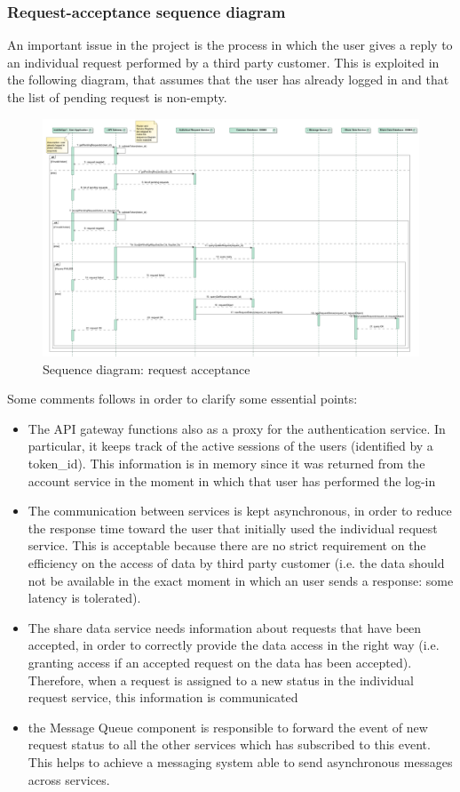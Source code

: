 \subsubsection{Request-acceptance sequence diagram}
An important issue in the project is the process in which the user gives a reply to an individual request
performed by a third party customer. 
This is exploited in the following diagram, that assumes that the user
has already logged in and that the list of pending request is non-empty.
\begin{figure}[H]
\includegraphics[width=\linewidth]{Images/requestacceptance.pdf}
\caption{ Sequence diagram: request acceptance }
\label{fig:requestacceptance}
\end{figure}

Some comments follows in order to clarify some essential points:
\begin{itemize}
\item The API gateway functions also as a proxy for the authentication service. In particular, it keeps track of the active sessions of the
users (identified by a token\_id). This information is in memory since
it was returned from the account service in the moment in which that user has performed the log-in
\item The communication between services is kept asynchronous, in order to reduce the response time 
toward the user that initially used the individual request service. This is acceptable because there are
no strict requirement on the efficiency on the access of data by third party customer (i.e. the data should
not be available in the exact moment in which an user sends a response: some latency is tolerated). 
\item The share data service needs information about requests that have been accepted, in order to correctly
provide the data access in the right way (i.e. granting access if an accepted request on the data has been 
accepted). Therefore, when a request is assigned to a new status in the individual request service, this information is communicated
\item the Message Queue component is responsible to forward the event of new request status to all the other services which has subscribed to this event. This helps to achieve a messaging system able to send asynchronous messages across services.
\end{itemize}


